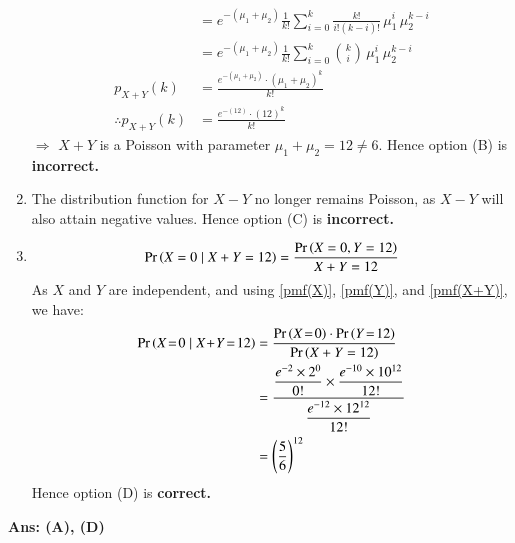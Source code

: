 \documentclass[journal,12pt,twocolumn]{IEEEtran}
\begin{document}
\begin{enumerate}[label=\textbf{(\Alph*)}]
\begin{align}
        &= e^{-(\mu_1 + \mu_2)}\frac 1{k!}\sum_{i=0}^k \frac{k!}{i!(k-i)!}\,\mu_1^i\,\mu_2^{k-i}\\
        &= e^{-(\mu_1 + \mu_2)}\frac 1{k!}\sum_{i=0}^k {k\choose i}\, \mu_1^i\,\mu_2^{k-i}\\
        p_{X+Y}(k) &= \frac{e^{-(\mu_1 + \mu_2)} \cdot (\mu_1 + \mu_2)^k}{k!} \\
        \therefore p_{X+Y}(k) &= \frac{e^{-(12)} \cdot (12)^k}{k!}\label{pmf(X+Y)}
    \end{align}
    $\Rightarrow$  $X+ Y$ is a Poisson with parameter $\mu_1 + \mu_2 = 12 \neq 6$. Hence option (B) is \textbf{incorrect.}\\
    \item The distribution function for $X - Y$ no longer remains Poisson, as $X - Y$ will also attain negative values.
    Hence option (C) is \textbf{incorrect.}

    \item \begin{align}
        \Pr\left(X=0\mid X+Y=12\right) = \dfrac{\Pr\left(X=0, Y=12\right)}{X+Y=12}
    \end{align}
    As $X$ and $Y$ are independent, and using \eqref{pmf(X)}, \eqref{pmf(Y)}, and \eqref{pmf(X+Y)}, we have:
    \begin{align}
        \pr{X\!=\!0\mid X\!+\!Y\!=\!12} &= \frac{\pr{X\!=\!0} \cdot \pr{Y\!=\!12}}{\pr{X+Y=12}} \\
        &= \frac{\dfrac{e^{-2}\times 2^{0}}{0!} \times \dfrac{e^{-10}\times10^{12}}{12!}}{\dfrac{e^{-12}\times12^{12}}{12!}}\\
        &= \left(\dfrac{5}{6}\right)^{12}
    \end{align}
    Hence option (D) is \textbf{correct.}
\end{enumerate}
\textbf{Ans: (A), (D)}
\end{document}

